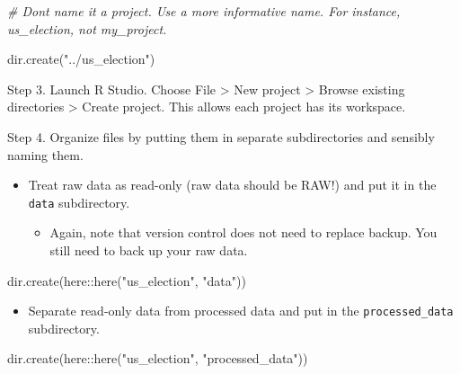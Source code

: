 \documentclass[
]{book}
\newenvironment{Shaded}{\begin{snugshade}}{\end{snugshade}}
\newcommand{\CommentTok}[1]{\textcolor[rgb]{0.56,0.35,0.01}{\textit{#1}}}
\newcommand{\FunctionTok}[1]{\textcolor[rgb]{0.00,0.00,0.00}{#1}}
\newcommand{\NormalTok}[1]{#1}
\newcommand{\SpecialCharTok}[1]{\textcolor[rgb]{0.00,0.00,0.00}{#1}}
\newcommand{\StringTok}[1]{\textcolor[rgb]{0.31,0.60,0.02}{#1}}
\providecommand{\tightlist}{%
  \setlength{\itemsep}{0pt}\setlength{\parskip}{0pt}}
\begin{document}
\begin{Shaded}
\begin{Highlighting}[]
\CommentTok{\# Don\textquotesingle{}t name it a project. Use a more informative name. For instance, \textasciigrave{}us\_election\textasciigrave{}, not \textasciigrave{}my\_project.\textasciigrave{}}

\FunctionTok{dir.create}\NormalTok{(}\StringTok{"../us\_election"}\NormalTok{)}
\end{Highlighting}
\end{Shaded}

Step 3. Launch R Studio. Choose File \textgreater{} New project \textgreater{} Browse existing directories \textgreater{} Create project. This allows each project has its workspace.

Step 4. Organize files by putting them in separate subdirectories and sensibly naming them.

\begin{itemize}
\item
  Treat raw data as read-only (raw data should be RAW!) and put it in the \texttt{data} subdirectory.

  \begin{itemize}
  \tightlist
  \item
    Again, note that version control does not need to replace backup. You still need to back up your raw data.
  \end{itemize}
\end{itemize}

\begin{Shaded}
\begin{Highlighting}[]
\FunctionTok{dir.create}\NormalTok{(here}\SpecialCharTok{::}\FunctionTok{here}\NormalTok{(}\StringTok{"us\_election"}\NormalTok{, }\StringTok{"data"}\NormalTok{))}
\end{Highlighting}
\end{Shaded}

\begin{itemize}
\tightlist
\item
  Separate read-only data from processed data and put in the \texttt{processed\_data} subdirectory.
\end{itemize}

\begin{Shaded}
\begin{Highlighting}[]
\FunctionTok{dir.create}\NormalTok{(here}\SpecialCharTok{::}\FunctionTok{here}\NormalTok{(}\StringTok{"us\_election"}\NormalTok{, }\StringTok{"processed\_data"}\NormalTok{))}
\end{Highlighting}
\end{Shaded}
\end{document}
